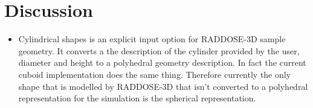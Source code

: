 \section{Discussion}
\label{sec:Discussion}
\begin{itemize}
    \item Cylindrical shapes is an explicit input option for RADDOSE-3D sample geometry. It converts a the description of the cylinder provided by the user, diameter and height to a polyhedral geometry description. In fact the current cuboid implementation does the same thing. Therefore currently the only shape that is modelled by RADDOSE-3D that isn't converted to a polyhedral representation for the simulation is the spherical representation.
\end{itemize}
